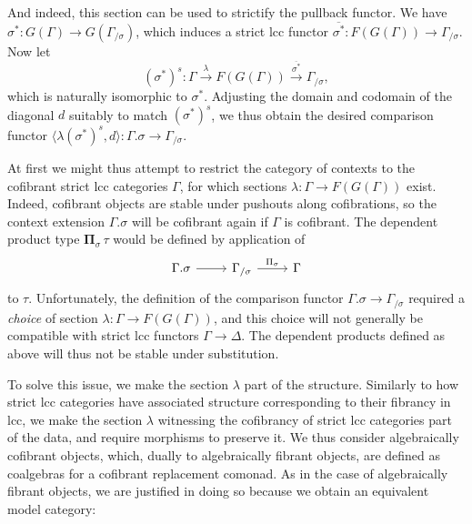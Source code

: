\documentclass[a4paper]{article}
\theoremstyle{remark}
\theoremstyle{definition}
\begin{document}
And indeed, this section can be used to strictify the pullback functor.
We have $\sigma^* : G(\Gamma) \rightarrow G(\Gamma_{/ \sigma})$, which induces a strict lcc functor $\overline{\sigma^*} : F(G(\Gamma)) \rightarrow \Gamma_{/ \sigma}$.
Now let
\begin{equation}
  (\sigma^*)^s : \Gamma \xrightarrow{\lambda} F(G(\Gamma)) \xrightarrow{\overline{\sigma^*}} \Gamma_{/ \sigma},
\end{equation}
which is naturally isomorphic to $\sigma^*$.
Adjusting the domain and codomain of the diagonal $d$ suitably to match $(\sigma^*)^s$, we thus obtain the desired comparison functor $\langle \lambda (\sigma^*)^s, d \rangle : \Gamma.\sigma \rightarrow \Gamma_{/ \sigma}$.

At first we might thus attempt to restrict the category of contexts to the cofibrant strict lcc categories $\Gamma$, for which sections $\lambda : \Gamma \rightarrow F(G(\Gamma))$ exist.
Indeed, cofibrant objects are stable under pushouts along cofibrations, so the context extension $\Gamma.\sigma$ will be cofibrant again if $\Gamma$ is cofibrant.
The dependent product type $\mathbf{\Pi}_\sigma \, \tau$ would be defined by application of
\begin{equation}
  \begin{tikzcd}
    \Gamma.\sigma \arrow[r] & \Gamma_{/ \sigma} \arrow[r, "\Pi_\sigma"] & \Gamma
  \end{tikzcd}
\end{equation}
to $\tau$.
Unfortunately, the definition of the comparison functor $\Gamma.\sigma \rightarrow \Gamma_{/ \sigma}$ required a \emph{choice} of section $\lambda : \Gamma \rightarrow F(G(\Gamma))$, and this choice will not generally be compatible with strict lcc functors $\Gamma \rightarrow \Delta$.
The dependent products defined as above will thus not be stable under substitution.

To solve this issue, we make the section $\lambda$ part of the structure.
Similarly to how strict lcc categories have associated structure corresponding to their fibrancy in lcc, we make the section $\lambda$ witnessing the cofibrancy of strict lcc categories part of the data, and require morphisms to preserve it.
We thus consider algebraically cofibrant objects, which, dually to algebraically fibrant objects, are defined as coalgebras for a cofibrant replacement comonad.
As in the case of algebraically fibrant objects, we are justified in doing so because we obtain an equivalent model category:
\end{document}
